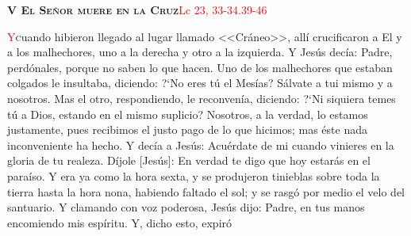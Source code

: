 \noindent\textbf{\textsc{V El Señor muere en la Cruz}}\hfill\textcolor{red}{Lc 23, 33-34.39-46}

\vspace{0.25em}

\lettrine[lines=2]{\textcolor{red}{Y}} cuando hibieron llegado al lugar llamado <<Cráneo>>, allí crucificaron a El y a los malhechores, uno a la derecha y otro a la izquierda.
Y Jesús decía: Padre, perdónales, porque no saben lo que hacen. Uno de los malhechores que estaban colgados le insultaba, diciendo: {?`}No eres tú el Mesías? Sálvate a tui mismo
y a nosotros. Mas el otro, respondiendo, le reconvenía, diciendo: {?`}Ni siquiera temes tú a Dios, estando en el mismo suplicio? Nosotros, a la verdad, lo estamos justamente,
pues recibimos el justo pago de lo que hicimos; mas éste nada inconveniente ha hecho. Y decía a Jesús: Acuérdate de mi cuando vinieres en la gloria de tu realeza. Díjole [Jesús]:
En verdad te digo que hoy estarás en el paraíso. Y era ya como la hora sexta, y se produjeron tinieblas sobre toda la tierra hasta la hora nona, habiendo faltado el sol; y se rasgó
por medio el velo del santuario. Y clamando con voz poderosa, Jesús dijo: Padre, en tus manos encomiendo mis espíritu. Y, dicho esto, expiró